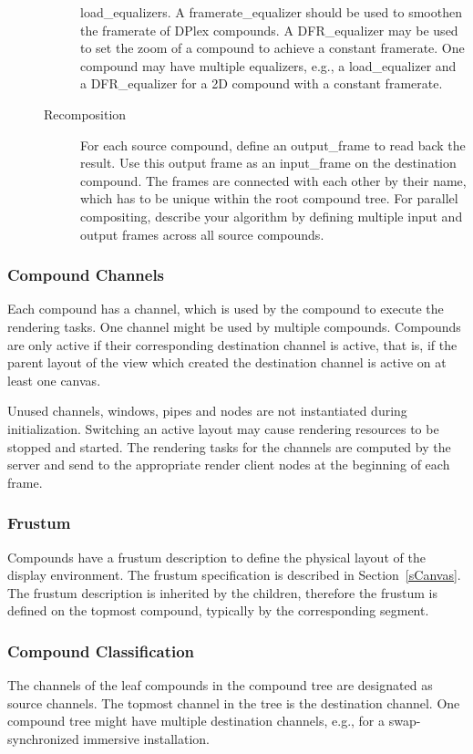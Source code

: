 \documentclass[10pt,a4]{scrartcl}
\newcommand{\sref}[1]{Section~\ref{#1}}
\begin{document}
\begin{description}
\begin{description}
    \textsf{load\_equalizer}s. A \textsf{framerate\_equalizer} should be
    used to smoothen the framerate of DPlex compounds. A
    \textsf{DFR\_equalizer} may be used to set the zoom of a compound to
    achieve a constant framerate. One compound may have multiple
    equalizers, e.g., a \textsf{load\_equalizer} and a
    \textsf{DFR\_equalizer} for a 2D compound with a constant framerate.
  \item[Recomposition] For each source compound, define an
    \textsf{output\_frame} to read back the result. Use this output frame
    as an \textsf{input\_frame} on the destination compound. The frames
    are connected with each other by their name, which has to be unique
    within the root compound tree. For parallel compositing, describe
    your algorithm by defining multiple input and output frames across
    all source compounds.
  \end{description}
\end{description}

\subsubsection{Compound Channels}
Each compound has a channel, which is used by the compound to execute the
rendering tasks. One channel might be used by multiple compounds. Compounds are
only active if their corresponding destination channel is active, that is, if
the parent layout of the view which created the destination channel is active on
at least one canvas.

Unused channels, windows, pipes and nodes are not instantiated during
initialization.  Switching an active layout may cause rendering resources to be
stopped and started. The rendering tasks for the channels are computed by the
server and send to the appropriate render client nodes at the beginning of each
frame.

\subsubsection{\label{sFrustum}Frustum}

Compounds have a frustum description to define the physical layout of the
display environment. The frustum specification is described in
\sref{sCanvas}. The frustum description is inherited by the children, therefore
the frustum is defined on the topmost compound, typically by the corresponding
segment.

\subsubsection{Compound Classification}
The channels of the leaf compounds in the compound tree are designated
as source channels. The topmost channel in the tree is the destination
channel. One compound tree might have multiple destination channels,
e.g., for a swap-synchronized immersive installation. 
\end{document}
